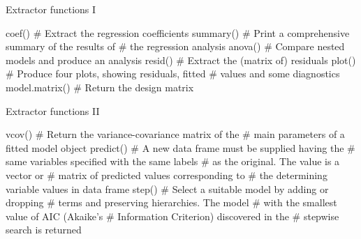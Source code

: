 \documentclass[
  ignorenonframetext,
]{beamer}
\newenvironment{Shaded}{\begin{snugshade}}{\end{snugshade}}
\newcommand{\CommentTok}[1]{\textcolor[rgb]{0.54,0.53,0.53}{#1}}
\newcommand{\FunctionTok}[1]{\textcolor[rgb]{0.39,0.29,0.61}{#1}}
\newcommand{\NormalTok}[1]{\textcolor[rgb]{0.12,0.11,0.11}{#1}}
\begin{document}
\begin{frame}[fragile]{Extractor functions I}
\protect\hypertarget{extractor-functions-i}{}
\begin{Shaded}
\begin{Highlighting}[]
\FunctionTok{coef}\NormalTok{()    }\CommentTok{\# Extract the regression coefficients}
\FunctionTok{summary}\NormalTok{() }\CommentTok{\# Print a comprehensive summary of the results of}
          \CommentTok{\# the regression analysis}
\FunctionTok{anova}\NormalTok{()   }\CommentTok{\# Compare nested models and produce an analysis}
\FunctionTok{resid}\NormalTok{()   }\CommentTok{\# Extract the (matrix of) residuals}
\FunctionTok{plot}\NormalTok{()    }\CommentTok{\# Produce four plots, showing residuals, fitted}
          \CommentTok{\# values and some diagnostics}
\FunctionTok{model.matrix}\NormalTok{()}
          \CommentTok{\# Return the design matrix}
\end{Highlighting}
\end{Shaded}
\end{frame}

\begin{frame}[fragile]{Extractor functions II}
\protect\hypertarget{extractor-functions-ii}{}
\begin{Shaded}
\begin{Highlighting}[]
\FunctionTok{vcov}\NormalTok{()    }\CommentTok{\# Return the variance{-}covariance matrix of the}
          \CommentTok{\# main parameters of a fitted model object}
\FunctionTok{predict}\NormalTok{() }\CommentTok{\# A new data frame must be supplied having the}
          \CommentTok{\# same variables specified with the same labels}
          \CommentTok{\# as the original. The value is a vector or}
          \CommentTok{\# matrix of predicted values corresponding to}
          \CommentTok{\# the determining variable values in data frame}
\FunctionTok{step}\NormalTok{()    }\CommentTok{\# Select a suitable model by adding or dropping}
          \CommentTok{\# terms and preserving hierarchies. The model}
          \CommentTok{\# with the smallest value of AIC (Akaike’s}
          \CommentTok{\# Information Criterion) discovered in the}
          \CommentTok{\# stepwise search is returned}
\end{Highlighting}
\end{Shaded}
\end{frame}
\end{document}
